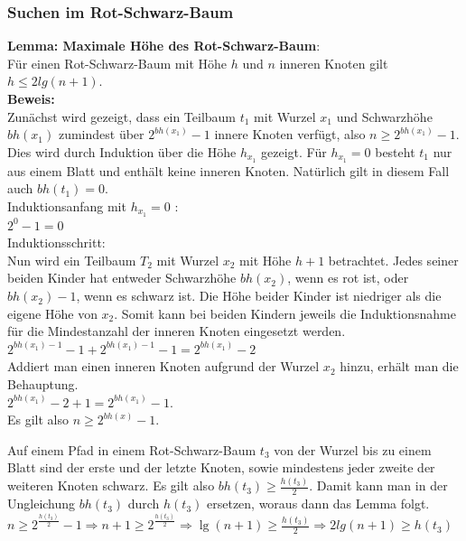 \documentclass[a4paper,12pt]{article}
\begin{document}
\subsubsection{Suchen im Rot-Schwarz-Baum}


\noindent\textbf{Lemma: Maximale Höhe des Rot-Schwarz-Baum}:\\
Für einen Rot-Schwarz-Baum mit Höhe $h$ und $n$ inneren Knoten gilt $h \leq  2 lg(n + 1)$. \\
\noindent\textbf{Beweis:}\\
Zunächst wird gezeigt, dass ein Teilbaum $t_1$ mit Wurzel $x_1$ und Schwarzhöhe $\mathit{bh(x_1)}$ zumindest über $2^{bh(x_1)} - 1$ innere Knoten verfügt, also $n \geq 2^{bh(x_1)} - 1 $. Dies wird durch Induktion über die Höhe $\mathit{h_{x_1}}$ gezeigt. Für $\mathit{h_{x_1}} = 0$ besteht $t_1$ nur aus einem Blatt und enthält keine inneren Knoten. Natürlich gilt in diesem Fall auch $\mathit{bh(t_1) = 0}$.  \\
Induktionsanfang mit $\mathit{h_{x_1} = 0}$ :\\
$2^{0} - 1 = 0$\\
Induktionsschritt:\\
Nun wird ein Teilbaum $T_2$ mit Wurzel $x_2$ mit Höhe $h + 1$ betrachtet. Jedes seiner beiden Kinder hat entweder Schwarzhöhe  $\mathit{bh(x_2)}$, wenn es rot ist, oder $\mathit{bh(x_2) - 1}$, wenn es schwarz ist. Die Höhe beider Kinder ist niedriger als die eigene Höhe von $x_2$. Somit kann bei beiden Kindern jeweils die Induktionsnahme für die Mindestanzahl der inneren Knoten eingesetzt werden.   \\
$2^{bh(x_1)-1} - 1 + 2^{bh(x_1)-1} - 1  = 2^{bh(x_1)} - 2 $ \\
Addiert man einen inneren Knoten aufgrund der Wurzel $x_2$ hinzu, erhält man die Behauptung.\\
$2^{bh(x_1)} - 2 + 1 = 2^{bh(x_1)} - 1 $.\\
Es gilt also $n \geq 2^{\mathit{bh(x)}} - 1$.

\noindent Auf einem Pfad in einem Rot-Schwarz-Baum $t_3$ von der Wurzel bis zu einem Blatt sind der erste und der letzte Knoten, sowie mindestens jeder zweite der weiteren Knoten schwarz. Es gilt also $\mathit{bh(t_3)} \geq \frac{h(t_3)}{2}$. 
Damit kann man in der Ungleichung $\mathit{bh(t_3)}$ durch $\mathit{h(t_3)}$ ersetzen, woraus dann das Lemma folgt.\\
$n \geq 2^{\frac{\mathit{h(t_3)}}{2}} - 1 \Rightarrow n + 1 \geq 2^{\frac{\mathit{h(t_3)}}{2}} \Rightarrow
\lg(n + 1) \geq \frac{h(t_3)}{2} \Rightarrow 2 lg(n + 1) \geq h(t_3) $ 



\newpage


\end{document}
